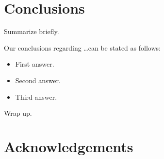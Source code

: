 \documentclass[useAMS,usenatbib]{mn2e}
\begin{document}

\section{Conclusions}
\label{sec:conclude}

Summarize briefly.

Our conclusions regarding \ldots can be stated as follows:

\begin{itemize}

\item First answer.

\item Second answer. 

\item Third answer. 

\end{itemize}

Wrap up.



\section*{Acknowledgements}







\label{lastpage}
\bsp
\end{document}
